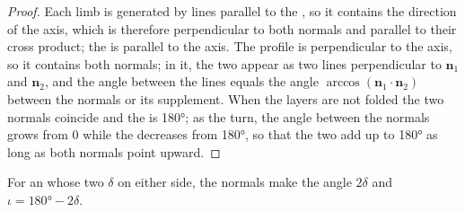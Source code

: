 \begin{proof}
Each limb is generated by lines parallel to the , so it contains the
direction of the axis, which is therefore perpendicular to both normals and
parallel to their cross product; the  is parallel to the axis. The
profile is perpendicular to the axis, so it contains both normals; in it, the
two  appear as two lines perpendicular to $\mathbf n_1$ and
$\mathbf n_2$, and the angle between the lines equals the angle
$\arccos(\mathbf n_1\cdot\mathbf n_2)$ between the normals or its supplement.
When the layers are not folded the two normals coincide and the  is \ang{180}; as the  turn, the angle between the normals grows
from $0$ while the  decreases from \ang{180}, so that the two
add up to \ang{180} as long as both normals point upward.
\end{proof}

For an  whose two   $\delta$ on either side, the normals
make the angle $2\delta$ and $\iota = \ang{180} - 2\delta$.

